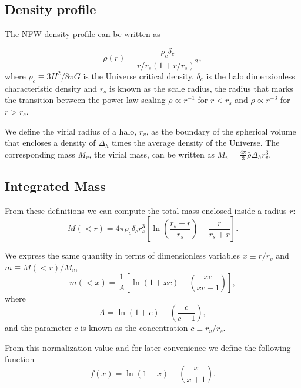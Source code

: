 \documentclass[useAMS,usenatbib]{mn2e}
\begin{document}
\subsection{Density profile}

The NFW density profile can be written as

\begin{equation}
\rho(r) = \frac{\rho_c\delta_c}{r/r_s(1+r/r_s)^2},
\label{eq:definition}
\end{equation}
%
where $\rho_c\equiv 3H^2/8\pi G$ is the Universe critical density,
$\delta_c$ is the halo dimensionless characteristic density and $r_s$
is known as the scale radius, the radius that marks the transition
between the power law scaling $\rho\propto r^{-1}$ for
$r<r_s$ and $\rho\propto r^{-3}$ for  $r>r_s$.

We define the virial radius of a halo, $r_v$, as the boundary of the
spherical volume that encloses a density of $\Delta_h$ times
the average density of the Universe. The corresponding mass $M_{v}$,
the virial mass, can be written as $M_{v} =
\frac{4\pi}{3}\bar{\rho}\Delta_h r_v^3$.


\subsection{Integrated Mass}
From these definitions we can compute the total mass enclosed inside a
radius $r$:
\begin{equation}
M(<r) = 4\pi\rho_c\delta_c  r_s^3\left[\ln \left
  (\frac{r_s+r}{r_s}\right) - \frac{r}{r_s+r}\right].
\end{equation}

We express the same quantity in terms of dimensionless
variables $x\equiv r/r_v$ and $m\equiv M(<r)/M_v$,
%
\begin{equation}
m(<x) =
\frac{1}{A}\left[\ln\left(1+xc\right)-\left(\frac{xc}{xc+1}\right)\right],
\label{eq:profile}
\end{equation}
%
where
%
\begin{equation}
A=\ln\left(1+c\right)-\left(\frac{c}{c+1}\right),
\end{equation}
%
and the parameter $c$ is known as the concentration $c\equiv r_v/r_s$.

From this normalization value and for later convenience we define the
following function
%
\begin{equation}
f(x) = \ln\left(1+x\right)-\left(\frac{x}{x+1}\right).
\label{eq:f_NFW}
\end{equation}
%
\end{document}
